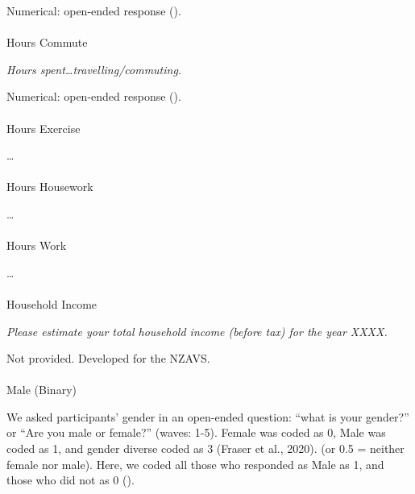 \documentclass[
  single column]{article}
\makeatletter
\let\oldparagraph\paragraph
\renewcommand{\paragraph}{
    \@ifstar
      \xxxParagraphStar
      \xxxParagraphNoStar
  }
\newcommand{\xxxParagraphStar}[1]{\oldparagraph*{#1}\mbox{}}
\newcommand{\xxxParagraphNoStar}[1]{\oldparagraph{#1}\mbox{}}
\makeatother
\begin{document}
Numerical: open-ended response ().

\paragraph{Hours Commute}\label{hours-commute}

\emph{Hours spent\ldots travelling/commuting.}

Numerical: open-ended response ().

\paragraph{Hours Exercise}\label{hours-exercise}

\ldots{}

\paragraph{Hours Housework}\label{hours-housework}

\ldots{}

\paragraph{Hours Work}\label{hours-work}

\ldots{}

\paragraph{Household Income}\label{household-income}

\emph{Please estimate your total household income (before tax) for the
year XXXX.}

Not provided. Developed for the NZAVS.

\paragraph{Male (Binary)}\label{male-binary}

We asked participants' gender in an open-ended question: ``what is your
gender?'' or ``Are you male or female?'' (waves: 1-5). Female was coded
as 0, Male was coded as 1, and gender diverse coded as 3 (Fraser et al.,
2020). (or 0.5 = neither female nor male). Here, we coded all those who
responded as Male as 1, and those who did not as 0
().
\end{document}
